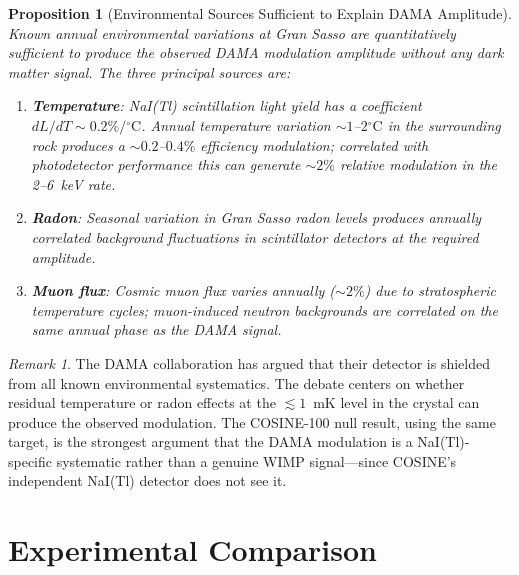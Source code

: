 \documentclass[12pt,a4paper]{article}
\newtheorem{proposition}[theorem]{Proposition}
\theoremstyle{definition}
\theoremstyle{remark}
\newtheorem{remark}[theorem]{Remark}
\begin{document}
\begin{proposition}[Environmental Sources Sufficient to Explain DAMA Amplitude]
\label{prop:systematic}
Known annual environmental variations at Gran Sasso are quantitatively
sufficient to produce the observed DAMA modulation amplitude without any
dark matter signal.  The three principal sources are:
\begin{enumerate}[label=(\roman*),nosep]
  \item \textbf{Temperature}: NaI(Tl) scintillation light yield has
  a coefficient $dL/dT \sim 0.2\%/{}^\circ\mathrm{C}$.  Annual
  temperature variation $\sim 1$--$2{}^\circ\mathrm{C}$ in the
  surrounding rock produces a $\sim 0.2$--$0.4\%$ efficiency
  modulation; correlated with photodetector performance this can
  generate $\sim 2\%$ relative modulation in the 2--6~keV rate.
  \item \textbf{Radon}: Seasonal variation in Gran Sasso radon levels
  produces annually correlated background fluctuations in scintillator
  detectors at the required amplitude.
  \item \textbf{Muon flux}: Cosmic muon flux varies annually ($\sim
  2\%$) due to stratospheric temperature cycles; muon-induced neutron
  backgrounds are correlated on the same annual phase as the DAMA signal.
\end{enumerate}
\end{proposition}

\begin{remark}
The DAMA collaboration has argued that their detector is shielded
from all known environmental systematics.  The debate centers on
whether residual temperature or radon effects at the $\lesssim 1$~mK
level in the crystal can produce the observed modulation.  The
COSINE-100 null result, using the same target, is the strongest
argument that the DAMA modulation is a NaI(Tl)-specific systematic
rather than a genuine WIMP signal---since COSINE's independent NaI(Tl)
detector does not see it.
\end{remark}

\section{Experimental Comparison}
\label{sec:compare}
\end{document}
